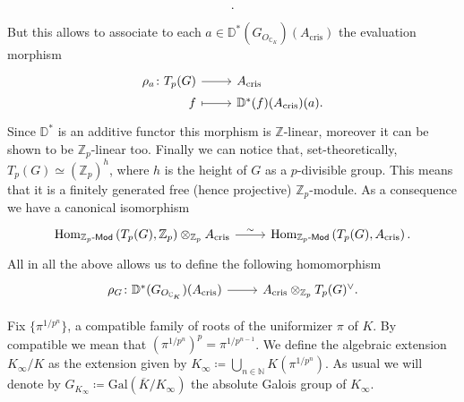 \begin{rem}[]
\begin{equation*}
\begin{tikzcd}[row sep = 0ex
		,/tikz/column 1/.append style={anchor=base east}
		,/tikz/column 2/.append style={anchor=base west}]
	.\end{tikzcd}
	\end{equation*} 
	But this allows to associate to each $a \in \mathbb{D}^*(G_{O_{\mathbb{C}_K}})(A_{\mathrm{cris}})$
	the evaluation morphism
	\begin{equation*}
	\begin{tikzcd}[row sep = 0ex
		,/tikz/column 1/.append style={anchor=base east}
		,/tikz/column 2/.append style={anchor=base west}]
		\rho_a\colon T_p(G)
		\arrow[r, "", rightarrow] &
		A_{\mathrm{cris}} \\
		f \arrow[r, "", mapsto] & 
		\mathbb{D}^*(f)(A_{\mathrm{cris}})(a)
	.\end{tikzcd}
	\end{equation*} 
	Since $\mathbb{D}^*$ is an additive functor this morphism
	is $\mathbb{Z}$-linear, moreover it can be shown to be $\mathbb{Z}_{p}$-linear too.
	Finally we can notice that, set-theoretically, $T_p(G) \simeq \left( \mathbb{Z}_p \right)^h$,
	where $h$ is the height of $G$ as a $p$-divisible group.
	This means that it is a finitely generated free (hence projective) $\mathbb{Z}_{p}$-module.
	As a consequence we have a canonical isomorphism
	\begin{equation*}
	\begin{tikzcd}[row sep = 0ex
		,/tikz/column 1/.append style={anchor=base east}
		,/tikz/column 2/.append style={anchor=base west}]
		\mathrm{Hom}_{\mathbb{Z}_{p}\text{-}\mathsf{Mod}}
		\left( T_p(G), \mathbb{Z}_{p} \right) \otimes_{\mathbb{Z}_{p}} A_{\mathrm{cris}}
		\arrow[r, "\sim", rightarrow] &
		\mathrm{Hom}_{ \mathbb{Z}_{p}\text{-}\mathsf{Mod} } \left( T_p(G), A_{\mathrm{cris}} \right)
	.\end{tikzcd}
	\end{equation*} 
	All in all the above allows us to define the following
	homomorphism
	\begin{equation*}
	\begin{tikzcd}[row sep = 0ex
		,/tikz/column 1/.append style={anchor=base east}
		,/tikz/column 2/.append style={anchor=base west}]
		\rho_G\colon 
		\mathbb{D}^*(G_{O_{\mathbb{C}_K}})(A_{\mathrm{cris}})
		\arrow[r, "", rightarrow] &
		A_{\mathrm{cris}} \otimes_{\mathbb{Z}_{p}} T_p(G)^\vee
	.\end{tikzcd}
	\end{equation*} 
\end{rem}


\begin{defn}[]
	Fix $\big\{ \pi^{1/p^n} \big\}$,
	a compatible family of roots of the uniformizer $\pi$ of $K$.
	By compatible we mean that $(\pi^{1/p^n})^p = \pi^{1/p^{n-1}}$.
	We define the algebraic extension $K_{\infty}/K$ as the extension given
	by $K_\infty \coloneqq \bigcup_{n \in \mathbb{N}} K(\pi^{1/p^n})$.
	As usual we will denote by $G_{K_\infty} \coloneqq \mathrm{Gal}
	\left( \overline{K} / K_\infty \right)$ 
	the absolute Galois group of $K_\infty$.
\end{defn}


